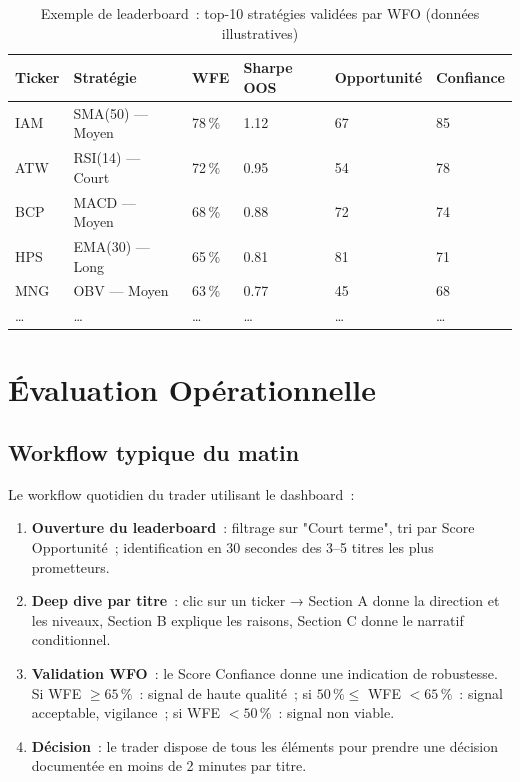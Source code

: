 \begin{table}[H]
\centering
\caption{Exemple de leaderboard~: top-10 stratégies validées par WFO (données illustratives)}
\label{tab:leaderboard_exemple}
\begin{tabularx}{\linewidth}{@{}llYYYY@{}}
\toprule
\textbf{Ticker} & \textbf{Stratégie} & \textbf{WFE} & \textbf{Sharpe OOS} & \textbf{Opportunité} & \textbf{Confiance} \\
\midrule
IAM    & SMA(50) — Moyen  & 78\,\% & 1.12 & 67 & 85 \\
ATW    & RSI(14) — Court  & 72\,\% & 0.95 & 54 & 78 \\
BCP    & MACD — Moyen     & 68\,\% & 0.88 & 72 & 74 \\
HPS    & EMA(30) — Long   & 65\,\% & 0.81 & 81 & 71 \\
MNG    & OBV — Moyen      & 63\,\% & 0.77 & 45 & 68 \\
\ldots & \ldots           & \ldots & \ldots & \ldots & \ldots \\
\bottomrule
\end{tabularx}
\end{table}


\section{Évaluation Opérationnelle}
\label{sec:evaluation_ux}

\subsection{Workflow typique du matin}

Le workflow quotidien du trader utilisant le dashboard~:

\begin{enumerate}
    \item \textbf{Ouverture du leaderboard}~: filtrage sur "Court terme", tri par
    Score Opportunité~; identification en 30 secondes des 3--5 titres les plus
    prometteurs.
    \item \textbf{Deep dive par titre}~: clic sur un ticker → Section A donne
    la direction et les niveaux, Section B explique les raisons, Section C donne
    le narratif conditionnel.
    \item \textbf{Validation WFO}~: le Score Confiance donne une indication de
    robustesse. Si WFE $\geq 65\,\%$~: signal de haute qualité~; si $50\,\% \leq$
    WFE $< 65\,\%$~: signal acceptable, vigilance~; si WFE $< 50\,\%$~: signal
    non viable.
    \item \textbf{Décision}~: le trader dispose de tous les éléments pour
    prendre une décision documentée en moins de 2 minutes par titre.
\end{enumerate}

